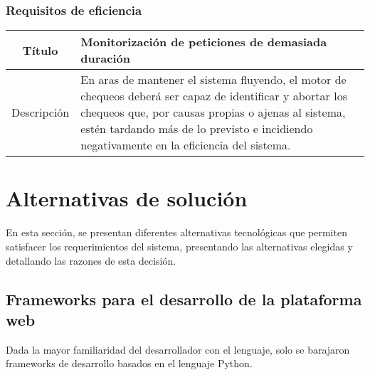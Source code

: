\FloatBarrier
\subsubsection{Requisitos de eficiencia}

\begin{center}
  
  \begin{tabularx}{\textwidth}{|c|X|}
    \hline
    Título & Monitorización de peticiones de demasiada duración \\

    \hline

    Descripción & En aras de mantener el sistema fluyendo, el motor de chequeos
    deberá ser capaz de identificar y abortar los chequeos que, por causas
    propias o ajenas al sistema, estén tardando más de lo previsto e incidiendo
    negativamente en la eficiencia del sistema. \\

    \hline
  \end{tabularx}
\end{center}

\section{Alternativas de solución}
\label{sec:alternativas-solucion}

En esta sección, se presentan diferentes alternativas tecnológicas que permiten
satisfacer los requerimientos del sistema, presentando las alternativas elegidas
y detallando las razones de esta decisión.


\subsection{Frameworks para el desarrollo de la plataforma web}

Dada la mayor familiaridad del desarrollador con el lenguaje, solo se barajaron
frameworks de desarrollo basados en el lenguaje Python.

